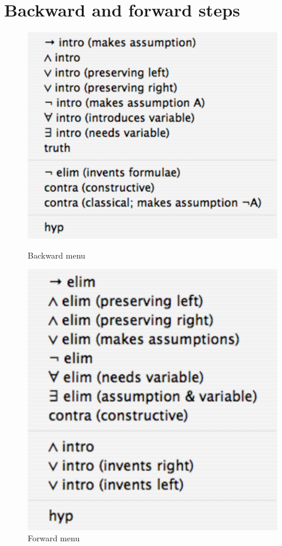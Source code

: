 \documentclass[11pt]{book}
\begin{document}
\chapter{Backward and forward steps}
\begin{figure}
\centering
\parbox[b]{200pt}{\centering
\includegraphics[scale=0.6]{pics/backwardmenu}
\caption{Backward menu}
\label{fig:backwardmenu}}
\qquad
\parbox[b]{200pt}{\centering
\includegraphics[scale=0.6]{pics/forwardmenu}
\caption{Forward menu}
\label{fig:forwardmenu}}
\end{figure}
\end{document}
